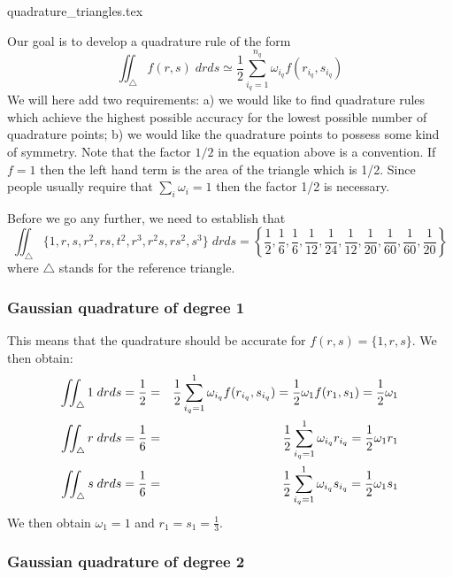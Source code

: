\begin{flushright} {\tiny {\color{gray} quadrature\_triangles.tex}} \end{flushright}


Our goal is to develop a quadrature rule of the form
\[
\iint_\triangle f(r,s) \; drds 
\simeq \frac12 \sum_{i_q=1}^{n_q} \omega_{i_q} f(r_{i_q},s_{i_q})
\]
We will here add two requirements:
a) we would like to find quadrature rules which achieve the highest possible accuracy for the lowest possible number of quadrature points; b) we would like the quadrature points to possess some kind of symmetry.
Note that the factor $1/2$ in the equation above is a convention. If $f=1$ then 
the left hand term is the area of the triangle which is 1/2. Since people 
usually require that $\sum_i\omega_i=1$ then the factor 1/2 is necessary.

Before we go any further, we need to establish that
\[
\iint_\triangle \{ 1,r,s,r^2,rs,t^2,r^3,r^2s,rs^2,s^3\}\; dr ds =
\left\{
\frac12,\frac16,\frac16,\frac{1}{12},\frac{1}{24},\frac{1}{12},
\frac{1}{20},\frac{1}{60},\frac{1}{60},\frac{1}{20}
\right\}
\]
where $\triangle$ stands for the reference triangle.

\subsubsection*{Gaussian quadrature of degree 1}

This means that the quadrature should be accurate for $f(r,s)=\{1,r,s\}$. 
We then obtain:
\begin{eqnarray}
\iint_\triangle 1 \; drds = \frac12 &=& \frac12 \sum_{i_q=1}^{1} \omega_{i_q} f(r_{i_q},s_{i_q}) = \frac12 \omega_1 f(r_1,s_1) = \frac12 \omega_1 \nonumber\\
\iint_\triangle r \; drds = \frac16 &=& \frac12 \sum_{i_q=1}^{1} \omega_{i_q} r_{i_q} 
= \frac12 \omega_1 r_1 \nonumber\\
\iint_\triangle s \; drds = \frac16 &=& \frac12 \sum_{i_q=1}^{1} \omega_{i_q} s_{i_q} 
= \frac12 \omega_1 s_1 \nonumber
\end{eqnarray}
We then obtain $\omega_1=1$ and $r_1=s_1=\frac13$.


\subsubsection*{Gaussian quadrature of degree 2}


